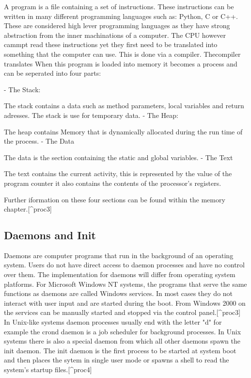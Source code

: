 A program is a file containing a set of instructions. These instructions can be written in many different 
programming languages such as: Python, C or C++. These are considered high lever programming languages as 
they have strong abstraction from the inner machinations of a computer. The CPU however cammpt read these 
instructions yet they first need to be translated into something that the computer can use. This is done 
via a compiler. Thecompiler translates When this program is loaded into memory it becomes a process and can 
be seperated into four parts:


- The Stack:

The stack contains a data such as method parameters, local variables and return adresses. The stack is use for temporary data.
- The Heap:

The heap contains Memory that is dynamically allocated during the run time of the process.
- The Data

The data is the section containing the static and global variables.
- The Text

The text contains the current activity, this is represented by the value of the program counter it also contains the contents of the processor's registers.

Further iformation on these four sections can be found within the memory chapter.[^proc3]


\subsection{Daemons and Init}

Daemons are computer programs that run in the background of an operating system. Users do not have direct
access to daemon processes and have no control over them. The implementation for daemons will differ from
operating system platforms. For Microsoft Windows NT systems, the programs that serve the same functions as 
daemons are called Windows services. In most cases they do not interact with user input and are started 
during the boot. From Windows 2000 on the services can be manually started and stopped via the control panel.[^proc3]
In Unix-like systems daemon processes usually end with the letter "d" for example the crond daemon is 
a job scheduler for background processes. In Unix systems there is also a special daemon from which all
other daemons spawn the init daemon. The init daemon is the first process to be started at system boot 
and then places the sytem in single user mode or spawns a shell to read the system's startup files.[^proc4]



